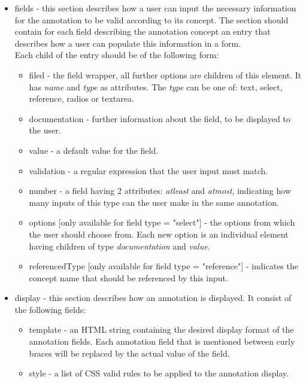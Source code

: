 \documentclass[a4paper, 12pt, notitlepage]{report}
\begin{document}
\begin{itemize}
 \item fields - this section describes how a user can input the necessary
information for the annotation to be valid according to its concept. The section
should contain for each field describing the annotation concept an entry that describes how a user can populate this information in a form.\\
Each child of the entry should be of the following form:
  \begin{itemize}
   \item filed - the field wrapper, all further options are children of this element. It has \textit{name} and \textit{type} as attributes. The \textit{type} can be  
   one of: text, select, reference, radios or textarea.
   \item documentation - further information about the field, to be displayed to the user.
   \item value - a default value for the field.
   \item validation - a regular expression that the user input must match.
   \item number - a field having 2 attributes: \textit{atleast} and \textit{atmost}, indicating how many inputs of this type can the user make in the same annotation.
   \item options [only available for field type = "select"] - the options from which the user should choose from. Each new option is an individual element having children 
   of type \textit{documentation} and \textit{value}.
   \item referencedType [only available for field type = "reference"] - indicates the concept name that should be referenced by this input.
  \end{itemize}
  \item display - this section describes how an annotation is displayed. It consist of the following fields:
  \begin{itemize}
   \item template - an HTML string containing the desired display format of the annotation fields. Each annotation field that is mentioned between curly
  braces will be replaced by the actual value of the field.
   \item style - a list of CSS valid rules to be applied to the annotation display.
  \end{itemize}

\end{itemize}
\end{document}
